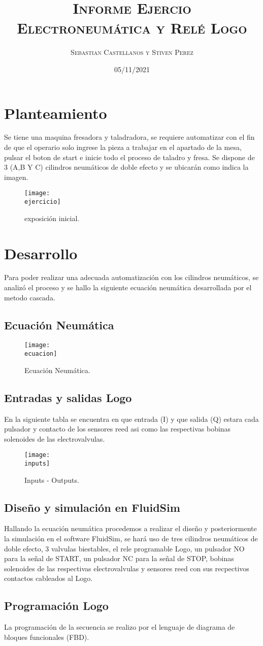\documentclass[a4paper, 11pt]{article}
\title{\scshape{} Informe Ejercio Electroneum\'atica y Rel\'e Logo}
\date{\scshape{} 05/11/2021}
\author{\scshape{} Sebastian Castellanos y Stiven Perez}
\newcommand{\ejercicio}{images/ejercicio.png}
\newcommand{\ecuacion}{images/ecuacionNeumatica.jpg}
\newcommand{\simulacion}{simulacion.pdf}
\newcommand{\esquema}{esquema.pdf}
\newcommand{\inputs}{images/io.png}
\begin{document}
  \maketitle{\scshape{}}
  \cfoot{\thepage}
\clearpage{}
\tableofcontents{}
\clearpage{}
\section{Planteamiento}
Se tiene una maquina fresadora y taladradora, se requiere automatizar con el fin de que el operario solo ingrese la pieza a trabajar en el apartado de la mesa, pulsar el boton de start e inicie todo el proceso de taladro y fresa. Se dispone de 3 (A,B Y C) cilindros neumáticos de doble efecto y se ubicarán como indica la imagen.
\vfill{}
\begin{figure}[h]
  \centering{}
  \texttt{[image: \\ejercicio]}
  \caption{exposición inicial.}
\end{figure}
\vfill{}
\section{Desarrollo}
Para poder realizar una adecuada automatización con los cilindros neumáticos, se analizó el proceso y se hallo la siguiente ecuación neumática desarrollada por el metodo cascada.
\vfill{}

\clearpage{}
\subsection{Ecuación Neumática}
\vfill{}
\begin{figure}[h]
  \centering{}
  \texttt{[image: \\ecuacion]}
  \caption{Ecuación Neumática.}
\end{figure}
\vfill{}
\subsection{Entradas y salidas Logo}
En la siguiente tabla se encuentra en que entrada (I) y que salida (Q) estara cada pulsador y contacto de los sensores reed asi como las respectivas bobinas solenoides de las electrovalvulas.
\begin{figure}[h]
  \centering{}
  \texttt{[image: \\inputs]}
  \caption{Inputs - Outputs.}
\end{figure}
\clearpage{}
\subsection{Diseño y simulación en FluidSim}
Hallando la ecuación neumática procedemos a realizar el diseño y posteriormente la simulación en el software FluidSim, se hará uso de tres cilindros neumáticos de doble efecto, 3 valvulas biestables, el rele programable Logo, un pulsador NO para la señal de START, un pulsador NC para la señal de STOP, bobinas solenoides de las respectivas electrovalvulas y sensores reed con sus recpectivos contactos cableados al Logo.



\subsection{Programación Logo}
La programación de la secuencia se realizo por el lenguaje de diagrama de bloques funcionales (FBD).

\end{document}
